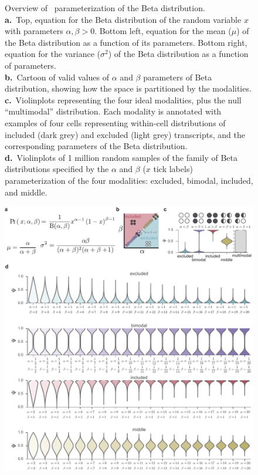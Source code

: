 \clearpage
\thispagestyle{facingcaption}
\begin{figure}[h]
\captionsetup{labelformat=prev-page}
  \caption[Overview of \anchor\, parameterization of the Beta distribution.]{
  Overview of \anchor\, parameterization of the Beta distribution.\\
\textbf{a.}~Top, equation for the Beta distribution of the random variable $x$ with parameters $\alpha, \beta > 0$. Bottom left, equation for the mean ($\mu$) of the Beta distribution as a function of its parameters. Bottom right, equation for the variance ($\sigma^2$) of the Beta distribution as a function of parameters.\\
\textbf{b.}~Cartoon of valid values of $\alpha$ and $\beta$ parameters of Beta distribution, showing how the space is partitioned by the modalities.\\
\textbf{c.}~Violinplots representing the four ideal modalities, plus the null ``multimodal'' distribution. Each modality is annotated with examples of four cells representing within-cell distributions of included (dark grey) and excluded (light grey) transcripts, and the corresponding parameters of the Beta distribution.\\
\textbf{d.}~Violinplots of 1 million random samples of the family of Beta distributions specified by the $\alpha$ and $\beta$ ($x$ tick labels) parameterization of the four modalities: excluded, bimodal, included, and middle.}
\label{fig:anchor_parameterization}
\end{figure}
\clearpage
\begin{figure}[h]
\ContinuedFloat
\captionsetup{labelformat=empty}
\centering
\includegraphics[width=5.8in]{figures/anchor_parameterization}
\end{figure}
